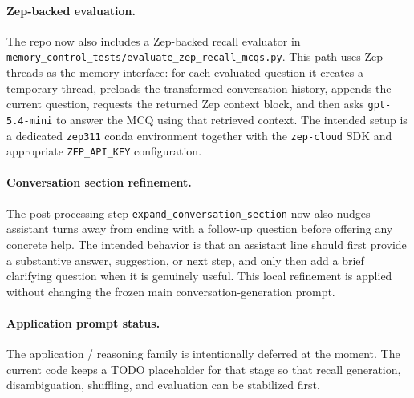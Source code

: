 \paragraph{Zep-backed evaluation.}
The repo now also includes a Zep-backed recall evaluator in \texttt{memory\_control\_tests/evaluate\_zep\_recall\_mcqs.py}. This path uses Zep threads as the memory interface: for each evaluated question it creates a temporary thread, preloads the transformed conversation history, appends the current question, requests the returned Zep context block, and then asks \texttt{gpt-5.4-mini} to answer the MCQ using that retrieved context. The intended setup is a dedicated \texttt{zep311} conda environment together with the \texttt{zep-cloud} SDK and appropriate \texttt{ZEP\_API\_KEY} configuration.

\paragraph{Conversation section refinement.}
The post-processing step \texttt{expand\_conversation\_section} now also nudges assistant turns away from ending with a follow-up question before offering any concrete help. The intended behavior is that an assistant line should first provide a substantive answer, suggestion, or next step, and only then add a brief clarifying question when it is genuinely useful. This local refinement is applied without changing the frozen main conversation-generation prompt.

\paragraph{Application prompt status.}
The application / reasoning family is intentionally deferred at the moment. The current code keeps a TODO placeholder for that stage so that recall generation, disambiguation, shuffling, and evaluation can be stabilized first.

